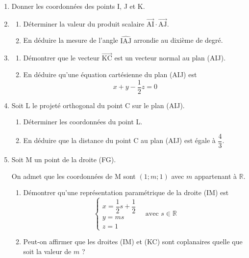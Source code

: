 \documentclass[10pt]{article}
\providecommand{\R}{\mathbb{R}}
\providecommand{\vectt}[1]{\overrightarrow{\mathrm{#1}}}
\begin{document}
	\begin{enumerate}
		\item Donner les coordonnées des points I, J et K.
		
		\item \begin{enumerate}
			\item Déterminer la valeur du produit scalaire $\vectt{AI}\cdot\vectt{AJ}$.
			
			\item En déduire la mesure de l'angle $\widehat{\mathrm{IAJ}}$ arrondie au dixième de degré.
		\end{enumerate}
		
		\item \begin{enumerate}
			\item Démontrer que le vecteur $\vectt{KC}$ est un vecteur normal au plan (AIJ).
			
			\item En déduire qu'une équation cartésienne du plan (AIJ) est \quad  \[x+y-\dfrac{1}{2}z=0\]
		\end{enumerate}
		
		\item Soit L le projeté orthogonal du point C sur le plan (AIJ).
		\begin{enumerate}
			\item Déterminer les coordonnées du point L.
			
			\item En déduire que la distance du point C au plan (AIJ) est égale à $\dfrac{4}{3}$.
		\end{enumerate}
		
		\item Soit M un point de la droite (FG).
		
		On admet que les coordonnées de M sont $(1 ; m ; 1)$ avec $m$ appartenant à $\R$.
		
		\begin{enumerate}
			\item Démontrer qu'une représentation paramétrique de la droite (IM) est
			\[\begin{cases}
				x=\dfrac{1}{2} s+\dfrac{1}{2} \\
				y=m s \\
				z=1
			\end{cases} \quad \text{avec } s \in \R\]
			
			\item Peut-on affirmer que les droites (IM) et (KC) sont coplanaires quelle que soit la valeur de $m$ ?
		\end{enumerate}
	\end{enumerate}
\end{document}
